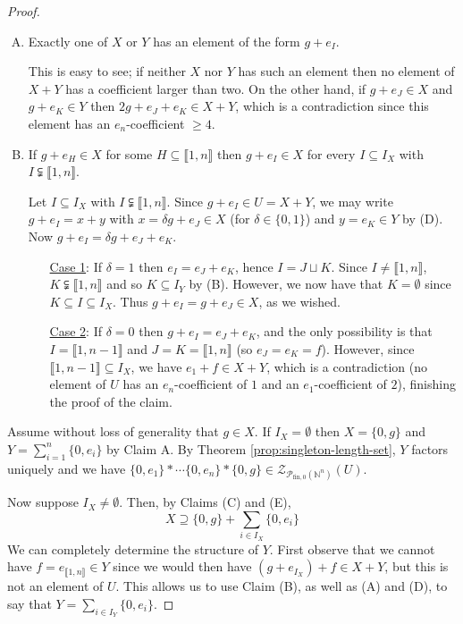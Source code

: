 \documentclass{report}
\newcommand{\NN}{\mathbb{N}}
\renewcommand{\P}{\mathcal{P}}
\newcommand{\Z}{\mathcal{Z}}
\newcommand{\llb}{\llbracket}
\newcommand{\rrb}{\rrbracket}
\newcommand{\fon}{{\textrm{fin}, 0}}
\renewcommand{\:}{\text{:}}
\theoremstyle{definition}
\begin{document}
\begin{proof}
\begin{enumerate}[(A)]
\item Exactly one of $X$ or $Y$ has an element of the form $g + e_I$. 

This is easy to see; if neither $X$ nor $Y$ has such an element then no element of $X+Y$ has a coefficient larger than two.
On the other hand, if $g+e_J\in X$ and $g+e_K\in Y$ then $2g + e_J + e_K \in X+Y$, which is a contradiction since this element has an $e_n$-coefficient $\ge 4$.

\item If $g+ e_H\in X$ for some $H\subseteq \llb 1,n \rrb$ then $g + e_I \in X$ for every $I\subseteq I_X$ with $I\subsetneqq \llb 1,n\rrb$. 

Let $I \subseteq I_X$ with $I\subsetneqq \llb1,n\rrb$.
Since $g+e_I\in U = X+Y$, we may write $g+e_I = x +y$ with $x = \delta g + e_J\in X$ (for $\delta\in \{0,1\}$) and $y=e_K\in Y$ by (D).
Now $g + e_I = \delta g + e_J + e_K$.
\begin{itemize}
\item[\underline{Case 1}:] If $\delta = 1$ then $e_I = e_J + e_K$, hence $I = J\sqcup K$. 
Since $I\neq \llb1,n\rrb$, $K\subsetneqq \llb 1,n \rrb$ and so $K\subseteq I_Y$ by (B).
However, we now have that $K = \emptyset$ since $K\subseteq I \subseteq I_X$.
Thus $g + e_I = g + e_J \in X$, as we wished.
\item[\underline{Case 2}:] If $\delta = 0$ then $g + e_I = e_J + e_K$, and the only possibility is that $I = \llb 1,n-1\rrb$ and $J = K = \llb 1,n\rrb$ (so $e_J = e_K = f$).
However, since $\llb 1,n-1 \rrb \subseteq I_X$, we have $e_1 + f \in X+Y$, which is a contradiction (no element of $U$ has an $e_n$-coefficient of $1$ and an $e_1$-coefficient of $2$), finishing the proof of the claim.
\end{itemize}
\end{enumerate}

Assume without loss of generality that $g\in X$.
If $I_X = \emptyset$ then $X = \{0,g\}$ and $Y = \sum_{i=1}^n \{0,e_i\}$ by Claim A.
By Theorem \ref{prop:singleton-length-set}, $Y$ factors uniquely and we have $\{0,e_1\}*\cdots \{0,e_n\}*\{0,g\}\in \Z_{\P_\fon(\NN^n)}(U)$.

Now suppose $I_X \neq \emptyset$.
Then, by Claims (C) and (E), 
\[X \supseteq \{0,g\} + \sum_{i\in I_X} \{0,e_i\} \tag{1} \label{factor-includes} \]
We can completely determine the structure of $Y$.
First observe that we cannot have $f=e_{\llb1,n\rrb}\in Y$ since we would then have $(g+e_{I_X})+f \in X+Y$, but this is not an element of $U$.
This allows us to use Claim (B), as well as (A) and (D), to say that $Y = \sum_{i\in I_Y} \{0,e_i\}$.


\end{proof}
\end{document}
